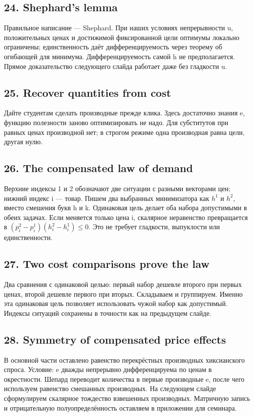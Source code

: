\documentclass[11pt,a4paper]{article}
\begin{document}
\subsection*{24. Shephard’s lemma}
Правильное написание — Shephard. При наших условиях непрерывности u, положительных ценах и достижимой фиксированной цели оптимумы локально ограничены; единственность даёт дифференцируемость через теорему об огибающей для минимума. Дифференцируемость самой h не предполагается. Прямое доказательство следующего слайда работает даже без гладкости u.

\subsection*{25. Recover quantities from cost}
Дайте студентам сделать производные прежде клика. Здесь достаточно знания e, функцию полезности заново оптимизировать не надо. Для субститутов при равных ценах производной нет; в строгом режиме одна производная равна цели, другая нулю.

\subsection*{26. The compensated law of demand}
Верхние индексы 1 и 2 обозначают две ситуации с разными векторами цен; нижний индекс i — товар. Пишем два выбранных минимизатора как $h^1$ и $h^2$, вместо смешения букв h и k. Одинаковая цель делает оба набора допустимыми в обеих задачах. Если меняется только цена i, скалярное неравенство превращается в $(p_i^2-p_i^1)(h_i^2-h_i^1)\le0$. Это не требует гладкости, выпуклости или единственности.

\subsection*{27. Two cost comparisons prove the law}
Два сравнения с одинаковой целью: первый набор дешевле второго при первых ценах, второй дешевле первого при вторых. Складываем и группируем. Именно эта одинаковая цель позволяет использовать чужой набор как допустимый. Индексы ситуаций сохранены в точности как на предыдущем слайде.

\subsection*{28. Symmetry of compensated price effects}
В основной части оставлено равенство перекрёстных производных хиксианского спроса. Условие: e дважды непрерывно дифференцируема по ценам в окрестности. Шепард переводит количества в первые производные e, после чего используем равенство смешанных производных. На следующем слайде сформулируем скалярное тождество взвешенных производных. Матричную запись и отрицательную полуопределённость оставляем в приложении для семинара.
\end{document}
